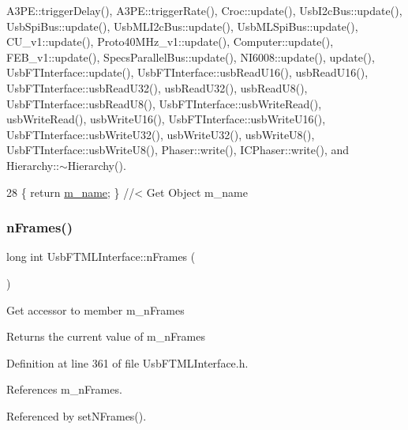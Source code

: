 A3\+P\+E\+::trigger\+Delay(), A3\+P\+E\+::trigger\+Rate(), Croc\+::update(), Usb\+I2c\+Bus\+::update(), Usb\+Spi\+Bus\+::update(), Usb\+M\+L\+I2c\+Bus\+::update(), Usb\+M\+L\+Spi\+Bus\+::update(), C\+U\+\_\+v1\+::update(), Proto40\+M\+Hz\+\_\+v1\+::update(), Computer\+::update(), F\+E\+B\+\_\+v1\+::update(), Specs\+Parallel\+Bus\+::update(), N\+I6008\+::update(), update(), Usb\+F\+T\+Interface\+::update(), Usb\+F\+T\+Interface\+::usb\+Read\+U16(), usb\+Read\+U16(), Usb\+F\+T\+Interface\+::usb\+Read\+U32(), usb\+Read\+U32(), usb\+Read\+U8(), Usb\+F\+T\+Interface\+::usb\+Read\+U8(), Usb\+F\+T\+Interface\+::usb\+Write\+Read(), usb\+Write\+Read(), usb\+Write\+U16(), Usb\+F\+T\+Interface\+::usb\+Write\+U16(), Usb\+F\+T\+Interface\+::usb\+Write\+U32(), usb\+Write\+U32(), usb\+Write\+U8(), Usb\+F\+T\+Interface\+::usb\+Write\+U8(), Phaser\+::write(), I\+C\+Phaser\+::write(), and Hierarchy\+::$\sim$\+Hierarchy().


\begin{DoxyCode}
28 \{ \textcolor{keywordflow}{return} \hyperlink{classObject_a8b83c95c705d2c3ba0d081fe1710f48d}{m\_name}; \} \textcolor{comment}{//< Get Object m\_name}
\end{DoxyCode}
\mbox{\label{classUsbFTMLInterface_a55531536a54b736b9c9c38bb792ec4c9}} 
\subsubsection{\texorpdfstring{n\+Frames()}{nFrames()}}
{\footnotesize\ttfamily long int Usb\+F\+T\+M\+L\+Interface\+::n\+Frames (\begin{DoxyParamCaption}{ }\end{DoxyParamCaption})\hspace{0.3cm}{\ttfamily [inline]}}

Get accessor to member m\+\_\+n\+Frames \begin{DoxyReturn}{Returns}
the current value of m\+\_\+n\+Frames 
\end{DoxyReturn}


Definition at line 361 of file Usb\+F\+T\+M\+L\+Interface.\+h.



References m\+\_\+n\+Frames.



Referenced by set\+N\+Frames().


